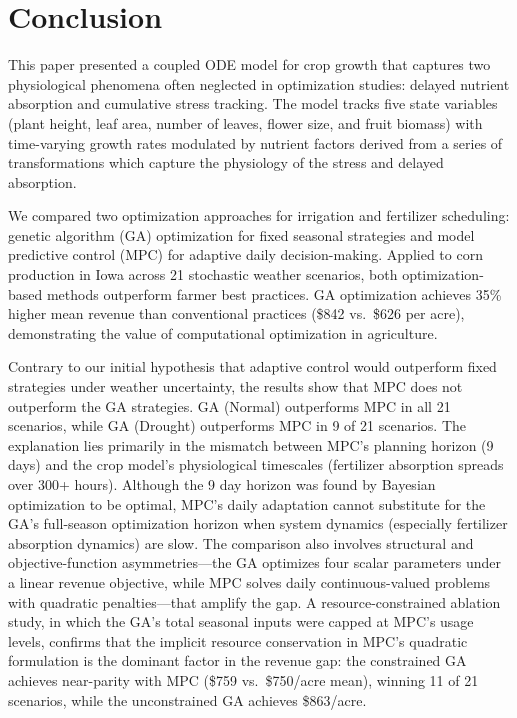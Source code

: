 \documentclass[pdflatex,sn-mathphys-num]{sn-jnl}
\begin{document}
\section{Conclusion}\label{sec:conclusion}

This paper presented a coupled ODE model for crop growth that captures two physiological phenomena often neglected in optimization studies: delayed nutrient absorption and cumulative stress tracking. The model tracks five state variables (plant height, leaf area, number of leaves, flower size, and fruit biomass) with time-varying growth rates modulated by nutrient factors derived from a series of transformations which capture the physiology of the stress and delayed absorption.

We compared two optimization approaches for irrigation and fertilizer scheduling: genetic algorithm (GA) optimization for fixed seasonal strategies and model predictive control (MPC) for adaptive daily decision-making. Applied to corn production in Iowa across 21 stochastic weather scenarios, both optimization-based methods outperform farmer best practices. GA optimization achieves 35\% higher mean revenue than conventional practices (\$842 vs.\ \$626 per acre), demonstrating the value of computational optimization in agriculture.

Contrary to our initial hypothesis that adaptive control would outperform fixed strategies under weather uncertainty, the results show that MPC does not outperform the GA strategies. GA (Normal) outperforms MPC in all 21 scenarios, while GA (Drought) outperforms MPC in 9 of 21 scenarios. The explanation lies primarily in the mismatch between MPC's planning horizon (9 days) and the crop model's physiological timescales (fertilizer absorption spreads over 300+ hours). Although the 9 day horizon was found by Bayesian optimization to be optimal, MPC's daily adaptation cannot substitute for the GA's full-season optimization horizon when system dynamics (especially fertilizer absorption dynamics) are slow. The comparison also involves structural and objective-function asymmetries---the GA optimizes four scalar parameters under a linear revenue objective, while MPC solves daily continuous-valued problems with quadratic penalties---that amplify the gap. A resource-constrained ablation study, in which the GA's total seasonal inputs were capped at MPC's usage levels, confirms that the implicit resource conservation in MPC's quadratic formulation is the dominant factor in the revenue gap: the constrained GA achieves near-parity with MPC (\$759 vs.\ \$750/acre mean), winning 11 of 21 scenarios, while the unconstrained GA achieves \$863/acre.
\end{document}
